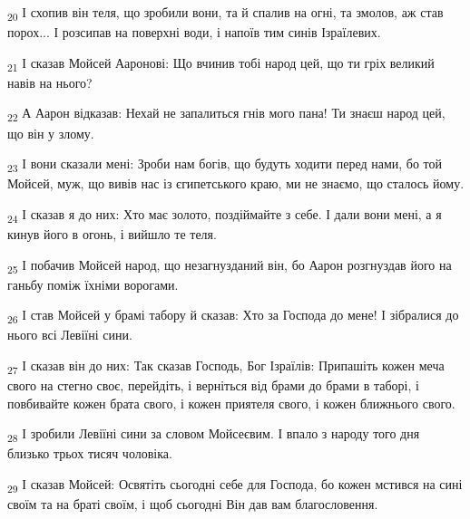 \begin{tcolorbox}
\textsubscript{20} І схопив він теля, що зробили вони, та й спалив на огні, та змолов, аж став порох... І розсипав на поверхні води, і напоїв тим синів Ізраїлевих.
\end{tcolorbox}
\begin{tcolorbox}
\textsubscript{21} І сказав Мойсей Ааронові: Що вчинив тобі народ цей, що ти гріх великий навів на нього?
\end{tcolorbox}
\begin{tcolorbox}
\textsubscript{22} А Аарон відказав: Нехай не запалиться гнів мого пана! Ти знаєш народ цей, що він у злому.
\end{tcolorbox}
\begin{tcolorbox}
\textsubscript{23} І вони сказали мені: Зроби нам богів, що будуть ходити перед нами, бо той Мойсей, муж, що вивів нас із єгипетського краю, ми не знаємо, що сталось йому.
\end{tcolorbox}
\begin{tcolorbox}
\textsubscript{24} І сказав я до них: Хто має золото, поздіймайте з себе. І дали вони мені, а я кинув його в огонь, і вийшло те теля.
\end{tcolorbox}
\begin{tcolorbox}
\textsubscript{25} І побачив Мойсей народ, що незагнузданий він, бо Аарон розгнуздав його на ганьбу поміж їхніми ворогами.
\end{tcolorbox}
\begin{tcolorbox}
\textsubscript{26} І став Мойсей у брамі табору й сказав: Хто за Господа до мене! І зібралися до нього всі Левіїні сини.
\end{tcolorbox}
\begin{tcolorbox}
\textsubscript{27} І сказав він до них: Так сказав Господь, Бог Ізраїлів: Припашіть кожен меча свого на стегно своє, перейдіть, і верніться від брами до брами в таборі, і повбивайте кожен брата свого, і кожен приятеля свого, і кожен ближнього свого.
\end{tcolorbox}
\begin{tcolorbox}
\textsubscript{28} І зробили Левіїні сини за словом Мойсеєвим. І впало з народу того дня близько трьох тисяч чоловіка.
\end{tcolorbox}
\begin{tcolorbox}
\textsubscript{29} І сказав Мойсей: Освятіть сьогодні себе для Господа, бо кожен мстився на сині своїм та на браті своїм, і щоб сьогодні Він дав вам благословення.
\end{tcolorbox}
